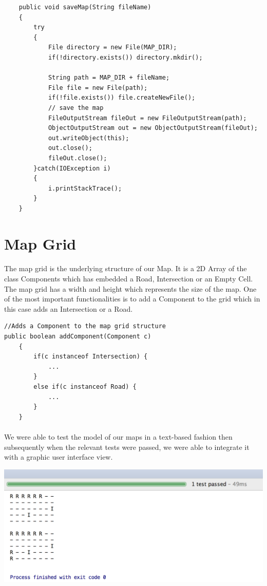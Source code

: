 \documentclass[a4paper]{article}
\begin{document}
\begin{lstlisting}
    public void saveMap(String fileName)
    {
        try
        {
            File directory = new File(MAP_DIR);
            if(!directory.exists()) directory.mkdir();
            
            String path = MAP_DIR + fileName;
            File file = new File(path);
            if(!file.exists()) file.createNewFile();
            // save the map
            FileOutputStream fileOut = new FileOutputStream(path);
            ObjectOutputStream out = new ObjectOutputStream(fileOut);
            out.writeObject(this);
            out.close();
            fileOut.close();
        }catch(IOException i)
        {
            i.printStackTrace();
        }
    }
\end{lstlisting}

\section{Map Grid}

\paragraph{}
The map grid is the underlying structure of our Map. It is a 2D Array of the class Components which has embedded a Road, Intersection or an Empty Cell. The map grid has a width and height which represents the size of the map. One of the most important functionalities is to add a Component to the grid which in this case adds an Intersection or a Road.

\begin{lstlisting}
//Adds a Component to the map grid structure
public boolean addComponent(Component c) 
    {
        if(c instanceof Intersection) {
            ...
        }
        else if(c instanceof Road) {
            ...
    	}
    }
\end{lstlisting}

\paragraph{}
We were able to test the model of our maps in a text-based fashion then subsequently when the relevant tests were passed, we were able to integrate it with a graphic user interface view.


\centerline{\includegraphics[scale=0.5]{test_mapgrid}}
\end{document}
